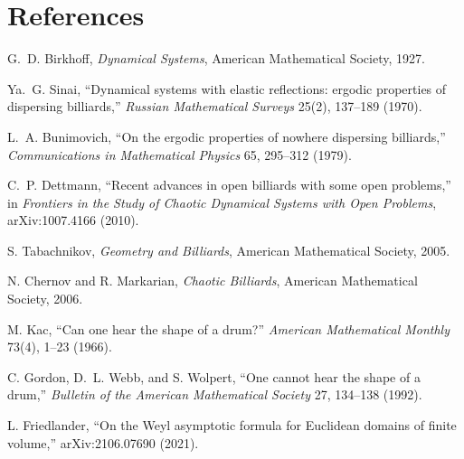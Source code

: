 \documentclass[11pt,a4paper]{article}
\theoremstyle{definition}
\theoremstyle{plain}
\theoremstyle{remark}
\begin{document}
\section*{References}
\begin{enumerate}[label={[\arabic*]},leftmargin=*,itemsep=3pt]
\item G.~D. Birkhoff, \emph{Dynamical Systems}, American
Mathematical Society, 1927.
\item Ya.~G. Sinai, ``Dynamical systems with elastic reflections:
ergodic properties of dispersing billiards,'' \emph{Russian
Mathematical Surveys} 25(2), 137--189 (1970).
\item L.~A. Bunimovich, ``On the ergodic properties of nowhere
dispersing billiards,'' \emph{Communications in Mathematical Physics}
65, 295--312 (1979).
\item C.~P. Dettmann, ``Recent advances in open billiards with some
open problems,'' in \emph{Frontiers in the Study of Chaotic
Dynamical Systems with Open Problems}, arXiv:1007.4166 (2010).
\item S. Tabachnikov, \emph{Geometry and Billiards}, American
Mathematical Society, 2005.
\item N. Chernov and R. Markarian, \emph{Chaotic Billiards},
American Mathematical Society, 2006.
\item M. Kac, ``Can one hear the shape of a drum?''
\emph{American Mathematical Monthly} 73(4), 1--23 (1966).
\item C. Gordon, D.~L. Webb, and S. Wolpert, ``One cannot hear the
shape of a drum,'' \emph{Bulletin of the American Mathematical
Society} 27, 134--138 (1992).
\item L. Friedlander, ``On the Weyl asymptotic formula for Euclidean
domains of finite volume,'' arXiv:2106.07690 (2021).
\end{enumerate}
\end{document}
